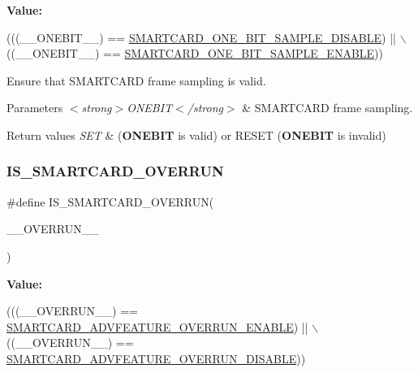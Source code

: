 {\bfseries Value\+:}
\begin{DoxyCode}
(((\_\_ONEBIT\_\_) == \hyperlink{group___s_m_a_r_t_c_a_r_d___one_bit___sampling_gabf94d10702dc8b36fe2b3bd04be83863}{SMARTCARD\_ONE\_BIT\_SAMPLE\_DISABLE}) || \(\backslash\)
                                                 ((\_\_ONEBIT\_\_) == 
      \hyperlink{group___s_m_a_r_t_c_a_r_d___one_bit___sampling_ga16d47e667a1a30513fbee0b05a2e53a6}{SMARTCARD\_ONE\_BIT\_SAMPLE\_ENABLE}))
\end{DoxyCode}


Ensure that S\+M\+A\+R\+T\+C\+A\+RD frame sampling is valid. 


\begin{DoxyParams}{Parameters}
{\em $<$strong$>$\+O\+N\+E\+B\+I\+T$<$/strong$>$} & S\+M\+A\+R\+T\+C\+A\+RD frame sampling. \\
\hline
\end{DoxyParams}

\begin{DoxyRetVals}{Return values}
{\em S\+ET} & ({\bfseries O\+N\+E\+B\+IT} is valid) or R\+E\+S\+ET ({\bfseries O\+N\+E\+B\+IT} is invalid) \\
\hline
\end{DoxyRetVals}
\mbox{\label{group___s_m_a_r_t_c_a_r_d___private___macros_ga62c2384d53181d9049ee70903a5bd597}} 
\subsubsection{\texorpdfstring{I\+S\+\_\+\+S\+M\+A\+R\+T\+C\+A\+R\+D\+\_\+\+O\+V\+E\+R\+R\+UN}{IS\_SMARTCARD\_OVERRUN}}
{\footnotesize\ttfamily \#define I\+S\+\_\+\+S\+M\+A\+R\+T\+C\+A\+R\+D\+\_\+\+O\+V\+E\+R\+R\+UN(\begin{DoxyParamCaption}\item[{}]{\+\_\+\+\_\+\+O\+V\+E\+R\+R\+U\+N\+\_\+\+\_\+ }\end{DoxyParamCaption})}

{\bfseries Value\+:}
\begin{DoxyCode}
(((\_\_OVERRUN\_\_) == \hyperlink{group___s_m_a_r_t_c_a_r_d___overrun___disable_gac7aa7a71b848682c80f1e78914c4cf82}{SMARTCARD\_ADVFEATURE\_OVERRUN\_ENABLE}) || \(\backslash\)
                                           ((\_\_OVERRUN\_\_) == 
      \hyperlink{group___s_m_a_r_t_c_a_r_d___overrun___disable_gaeced20fff0535f18358ccda594c59cbf}{SMARTCARD\_ADVFEATURE\_OVERRUN\_DISABLE}))
\end{DoxyCode}


